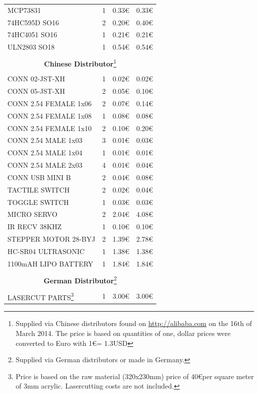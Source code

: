 \documentclass[11pt,a4paper]{article}
\begin{document}
\begin{longtable}{p{}p{}p{}p{}}
MCP73831 & 1 & 0.33\euro & 0.33\euro \\
74HC595D SO16 & 2 & 0.20\euro & 0.40\euro \\
74HC4051 SO16 & 1 & 0.21\euro & 0.21\euro \\
ULN2803 SO18 & 1 & 0.54\euro & 0.54\euro \\
\\
\multicolumn{4}{c}{\textbf{Chinese Distributor}\footnote{\label{edragon}Supplied via Chinese distributors found on \url{http://alibaba.com} on the 16th of March 2014. The price is based on quantities of one, dollar prices were converted to Euro with 1\euro = 1.3USD }}\\
\\
CONN 02-JST-XH & 1 & 0.02\euro & 0.02\euro \\
CONN 05-JST-XH & 2 & 0.05\euro & 0.10\euro \\
CONN 2.54 FEMALE 1x06 & 2 & 0.07\euro & 0.14\euro \\
CONN 2.54 FEMALE 1x08 & 1 & 0.08\euro & 0.08\euro \\
CONN 2.54 FEMALE 1x10 & 2 & 0.10\euro & 0.20\euro \\
CONN 2.54 MALE 1x03 & 3 & 0.01\euro & 0.03\euro \\
CONN 2.54 MALE 1x04 & 1 & 0.01\euro & 0.01\euro \\
CONN 2.54 MALE 2x03 & 4 & 0.01\euro & 0.04\euro \\
CONN USB MINI B & 2 & 0.04\euro & 0.08\euro \\
TACTILE SWITCH & 2 & 0.02\euro & 0.04\euro \\
TOGGLE SWITCH & 1 & 0.03\euro & 0.03\euro \\
MICRO SERVO & 2 & 2.04\euro & 4.08\euro \\
IR RECV 38KHZ & 1 & 0.10\euro & 0.10\euro \\
STEPPER MOTOR 28-BYJ & 2 & 1.39\euro & 2.78\euro \\
HC-SR04 ULTRASONIC & 1 & 1.38\euro & 1.38\euro \\
1100mAH LIPO BATTERY & 1 & 1.84\euro & 1.84\euro \\
\\
\multicolumn{4}{c}{\textbf{German Distributor}\footnote{Supplied via German distributors or made in Germany.}}\\
\\
LASERCUT PARTS\footnote{Price is based on the raw material (320x230mm) price of 40\euro per square meter of 3mm acrylic. Lasercutting costs are not included. } & 1 & 3.00\euro & 3.00\euro \\

\end{longtable}
\end{document}
